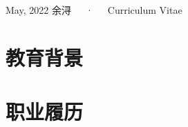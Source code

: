 \documentclass[11pt,a4paper,]{awesome-cv}
\begin{document}
\makecvheader

\makecvfooter
  {May, 2022}
    {余浔~~~·~~~Curriculum Vitae}
  {\thepage}





\hypertarget{ux6559ux80b2ux80ccux666f}{%
\section{教育背景}\label{ux6559ux80b2ux80ccux666f}}

\begin{cventries}
    \vspace{-4.0mm}
    \vspace{-4.0mm}
\end{cventries}

\hypertarget{ux804cux4e1aux5c65ux5386}{%
\section{职业履历}\label{ux804cux4e1aux5c65ux5386}}
\end{document}
